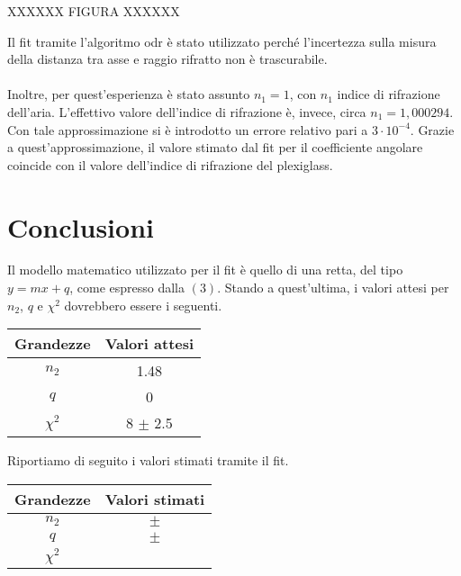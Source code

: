 \documentclass{article}
\begin{document}
	XXXXXX FIGURA XXXXXX
	
	
	Il fit tramite l'algoritmo odr è stato utilizzato perché l'incertezza sulla misura della distanza tra asse e raggio rifratto non è trascurabile.
	\\
	\\
	Inoltre, per quest'esperienza è stato assunto $n_1=1$, con $n_1$ indice di rifrazione dell'aria. L'effettivo valore dell'indice di rifrazione è, invece, circa $n_1=1,000294$. Con tale approssimazione si è introdotto un errore relativo pari a $ 3\cdot 10^{-4}$. Grazie a quest'approssimazione, il valore stimato dal fit per il coefficiente angolare coincide con il valore dell'indice di rifrazione del plexiglass.
	
	\section{Conclusioni}
	Il modello matematico utilizzato per il fit è quello di una retta, del tipo $y=mx+q$, come espresso dalla $(3)$. Stando a quest'ultima, i valori attesi per $n_2$, $q$ e $\chi^2$ dovrebbero essere i seguenti.
	
	\vspace{1em}
	
	\begin{center}
		\begin{tabular}{cc}
			\hline
			Grandezze & Valori attesi\\
			\hline
			$n_2$ & 1.48 \\
			$q$ &  0 \\
			$\chi^2$ &  8 $\pm$ 2.5 \\
			\hline
		\end{tabular}
	\end{center}
	
	\vspace{1em}
	
	Riportiamo di seguito i valori stimati tramite il fit.
	
	\vspace{1em}
	
	\begin{center}
		\begin{tabular}{cc}
			\hline
			Grandezze & Valori stimati \\
			\hline
			$n_2$ & $  \pm$  \\
			$q$ & $ \pm$  \\
			$\chi^2$ & $$ \\
			\hline
			
		\end{tabular}
	\end{center}
	
\end{document}
